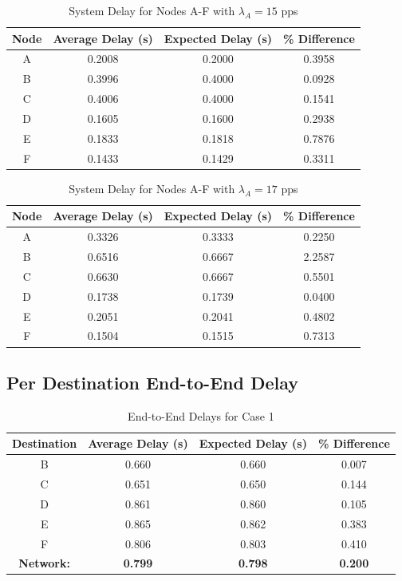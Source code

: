 \documentclass{article}
\begin{document}
\begin{appendices}
\begin{table}[h!]
\centering
\begin{tabular}{|c|c|c|c|} \hline
\textbf{Node} & \textbf{Average Delay (s)} & \textbf{Expected Delay (s)} & \textbf{\% Difference} \\ \hline
A & 0.2008 & 0.2000 & 0.3958 \\ \hline
B & 0.3996 & 0.4000 & 0.0928 \\ \hline
C & 0.4006 & 0.4000 & 0.1541 \\ \hline
D & 0.1605 & 0.1600 & 0.2938 \\ \hline
E & 0.1833 & 0.1818 & 0.7876 \\ \hline
F & 0.1433 & 0.1429 & 0.3311 \\ \hline
\end{tabular}
\caption{System Delay for Nodes A-F with $\lambda_A = 15$ pps}
\label{tab:simNodeTimeA}
\end{table}

\begin{table}[h!]
\centering
\begin{tabular}{|c|c|c|c|} \hline
\textbf{Node} & \textbf{Average Delay (s)} & \textbf{Expected Delay (s)} & \textbf{\% Difference} \\ \hline
A & 0.3326 & 0.3333 & 0.2250 \\ \hline
B & 0.6516 & 0.6667 & 2.2587 \\ \hline
C & 0.6630 & 0.6667 & 0.5501 \\ \hline
D & 0.1738 & 0.1739 & 0.0400 \\ \hline
E & 0.2051 & 0.2041 & 0.4802 \\ \hline
F & 0.1504 & 0.1515 & 0.7313 \\ \hline
\end{tabular}
\caption{System Delay for Nodes A-F with $\lambda_A = 17$ pps}
\label{tab:simNodeTimeB}
\end{table}

\newpage
\subsection*{Per Destination End-to-End Delay}
\begin{table}[h!]
\centering
\begin{tabular}{|c|c|c|c|} \hline
\textbf{Destination} & \textbf{Average Delay (s)} & \textbf{Expected Delay (s)} & \textbf{\% Difference} \\ \hline
B & 0.660 & 0.660 & 0.007 \\ \hline
C & 0.651 & 0.650 & 0.144 \\ \hline
D & 0.861 & 0.860 & 0.105 \\ \hline
E & 0.865 & 0.862 & 0.383 \\ \hline
F & 0.806 & 0.803 & 0.410 \\ \hline
\textbf{Network:} & \textbf{0.799} & \textbf{0.798} & \textbf{0.200} \\ \hline
\end{tabular}
\caption{End-to-End Delays for Case 1}
\label{tab:nodeDelayA}
\end{table}


\end{appendices}
\end{document}
